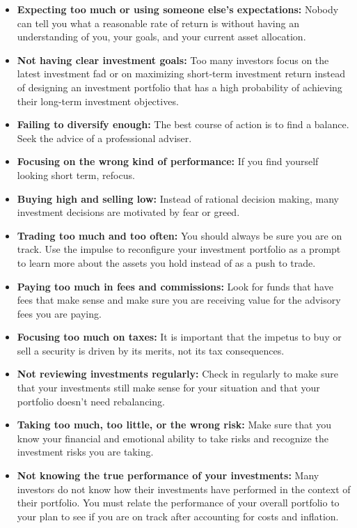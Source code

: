 \documentclass[
  12pt,
  oneside]{book}
\providecommand{\tightlist}{%
  \setlength{\itemsep}{0pt}\setlength{\parskip}{0pt}}
\theoremstyle{definition}
\theoremstyle{definition}
\theoremstyle{definition}
\theoremstyle{definition}
\theoremstyle{remark}
\begin{document}
\begin{itemize}
\tightlist
\item
  \textbf{Expecting too much or using someone else's expectations:} Nobody can tell you what a reasonable rate of return is without having an understanding of you, your goals, and your current asset allocation.
\item
  \textbf{Not having clear investment goals:} Too many investors focus on the latest investment fad or on maximizing short-term investment return instead of designing an investment portfolio that has a high probability of achieving their long-term investment objectives.
\item
  \textbf{Failing to diversify enough:} The best course of action is to find a balance. Seek the advice of a professional adviser.
\item
  \textbf{Focusing on the wrong kind of performance:} If you find yourself looking short term, refocus.
\item
  \textbf{Buying high and selling low:} Instead of rational decision making, many investment decisions are motivated by fear or greed.
\item
  \textbf{Trading too much and too often:} You should always be sure you are on track. Use the impulse to reconfigure your investment portfolio as a prompt to learn more about the assets you hold instead of as a push to trade.
\item
  \textbf{Paying too much in fees and commissions:} Look for funds that have fees that make sense and make sure you are receiving value for the advisory fees you are paying.
\item
  \textbf{Focusing too much on taxes:} It is important that the impetus to buy or sell a security is driven by its merits, not its tax consequences.
\item
  \textbf{Not reviewing investments regularly:} Check in regularly to make sure that your investments still make sense for your situation and that your portfolio doesn't need rebalancing.
\item
  \textbf{Taking too much, too little, or the wrong risk:} Make sure that you know your financial and emotional ability to take risks and recognize the investment risks you are taking.
\item
  \textbf{Not knowing the true performance of your investments:}
  Many investors do not know how their investments have performed in the context of their portfolio. You must relate the performance of your overall portfolio to your plan to see if you are on track after accounting for costs and inflation.

\end{itemize}
\end{document}
